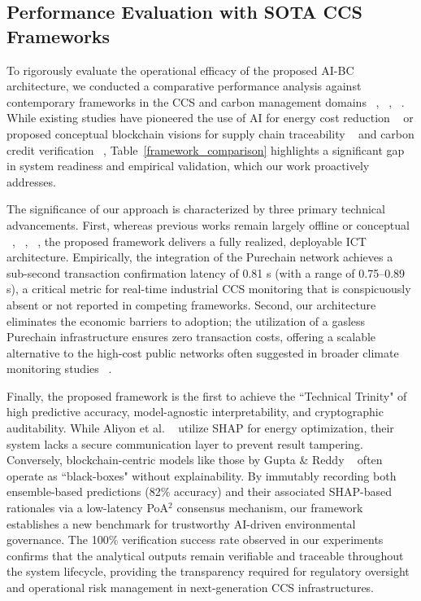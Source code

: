 \documentclass[conference]{IEEEtran}
\begin{document}
{\subsection{Performance Evaluation with SOTA CCS Frameworks}
To rigorously evaluate the operational efficacy of the proposed AI-BC architecture, we conducted a comparative performance analysis against contemporary frameworks in the CCS and carbon management domains ~\cite{aliyon2023use}, ~\cite{patro2024blockchain}, ~\cite{gupta2025ai}. While existing studies have pioneered the use of AI for energy cost reduction ~\cite{aliyon2023use} or proposed conceptual blockchain visions for supply chain traceability ~\cite{patro2024blockchain} and carbon credit verification ~\cite{gupta2025ai}, Table~\ref{framework_comparison}  highlights a significant gap in system readiness and empirical validation, which our work proactively addresses.

The significance of our approach is characterized by three primary technical advancements. First, whereas previous works remain largely offline or conceptual ~\cite{abdi2021modeling},
~\cite{mohammadi2024predictive}, ~\cite{patro2024blockchain}, the proposed framework delivers a fully realized, deployable ICT architecture. Empirically, the integration of the Purechain network achieves a sub-second transaction confirmation latency of 0.81 s (with a range of 0.75--0.89 s), a critical metric for real-time industrial CCS monitoring that is conspicuously absent or not reported in competing frameworks. Second, our architecture eliminates the economic barriers to adoption; the utilization of a gasless Purechain infrastructure ensures zero transaction costs, offering a scalable alternative to the high-cost public networks often suggested in broader climate monitoring studies ~\cite{gupta2025ai}. 



Finally, the proposed framework is the first to achieve the ``Technical Trinity" of high predictive accuracy, model-agnostic interpretability, and cryptographic auditability. While Aliyon et al. ~\cite{aliyon2023use} utilize SHAP for energy optimization, their system lacks a secure communication layer to prevent result tampering. Conversely, blockchain-centric models like those by Gupta \& Reddy ~\cite{gupta2025ai} often operate as ``black-boxes" without explainability. By immutably recording both ensemble-based predictions (82\% accuracy) and their associated SHAP-based rationales via a low-latency PoA$^{2}$ consensus mechanism, our framework establishes a new benchmark for trustworthy AI-driven environmental governance. The 100\% verification success rate observed in our experiments confirms that the analytical outputs remain verifiable and traceable throughout the system lifecycle, providing the transparency required for regulatory oversight and operational risk management in next-generation CCS infrastructures.







}
\end{document}
